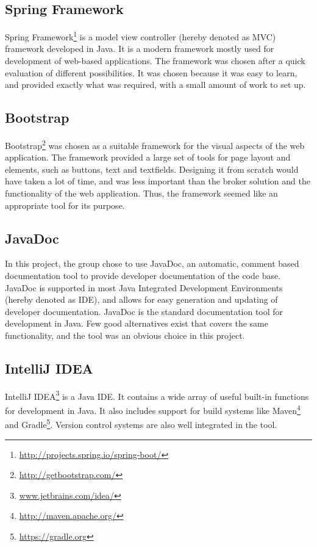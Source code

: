 \subsection{Spring Framework}
\label{subsec:prestudies-tools-spring_mvc}

Spring Framework\footnote{\url{http://projects.spring.io/spring-boot/}} is a model view controller (hereby denoted as MVC) framework developed in Java. It is a modern framework mostly used for development of web-based applications. The framework was chosen after a quick evaluation of different possibilities. It was chosen because it was easy to learn, and provided exactly what was required, with a small amount of work to set up.

\subsection{Bootstrap}
\label{subsec:prestudies-tools-bootstrap}

Bootstrap\footnote{\url{http://getbootstrap.com/}} was chosen as a suitable framework for the visual aspects of the web application. The framework provided a large set of tools for page layout and elements, such as buttons, text and textfields. Designing it from scratch would have taken a lot of time, and was less important than the broker solution and the functionality of the web application. Thus, the framework seemed like an appropriate tool for its purpose.

\subsection{JavaDoc}
\label{subsec:prestudies-tools-javadoc}

In this project, the group chose to use JavaDoc, an automatic, comment based documentation tool to provide developer documentation of the code base. JavaDoc is supported in most Java Integrated Development Environments (hereby denoted as IDE), and allows for easy generation and updating of developer documentation. JavaDoc is the standard documentation tool for development in Java. Few good alternatives exist that covers the same functionality, and the tool was an obvious choice in this project.

\subsection{IntelliJ IDEA}
\label{subsec:prestudies-tools-intellij_idea}

IntelliJ IDEA\footnote{\url{www.jetbrains.com/idea/}} is a Java IDE. It contains a wide array of useful built-in functions for development in Java. It also includes support for build systems like Maven\footnote{\url{http://maven.apache.org/}} and Gradle\footnote{\url{https://gradle.org}}. Version control systems are also well integrated in the tool.

